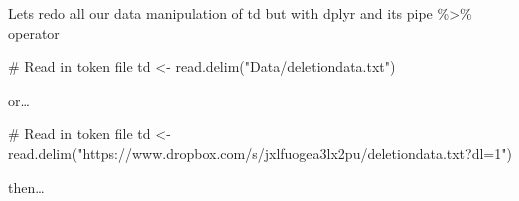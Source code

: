 \documentclass[
  12pt,
  letterpaper]{article}
\newenvironment{Shaded}{\begin{snugshade}}{\end{snugshade}}
\newcommand{\CommentTok}[1]{\textcolor[rgb]{0.37,0.37,0.37}{#1}}
\newcommand{\FunctionTok}[1]{\textcolor[rgb]{0.28,0.35,0.67}{#1}}
\newcommand{\NormalTok}[1]{\textcolor[rgb]{0.00,0.23,0.31}{#1}}
\newcommand{\OtherTok}[1]{\textcolor[rgb]{0.00,0.23,0.31}{#1}}
\newcommand{\StringTok}[1]{\textcolor[rgb]{0.13,0.47,0.30}{#1}}
\renewcommand\texttt[1]{{\ttfamily\color{BrickRed}#1}}
\begin{document}
Lets redo all our data manipulation of \texttt{td} but with
\texttt{dplyr} and its pipe \texttt{\%\textgreater{}\%} operator

\begin{Shaded}
\begin{Highlighting}[]
\CommentTok{\# Read in token file}
\NormalTok{td }\OtherTok{\textless{}{-}} \FunctionTok{read.delim}\NormalTok{(}\StringTok{"Data/deletiondata.txt"}\NormalTok{)}
\end{Highlighting}
\end{Shaded}

or\ldots{}

\begin{Shaded}
\begin{Highlighting}[]
\CommentTok{\# Read in token file}
\NormalTok{td }\OtherTok{\textless{}{-}} \FunctionTok{read.delim}\NormalTok{(}\StringTok{"https://www.dropbox.com/s/jxlfuogea3lx2pu/deletiondata.txt?dl=1"}\NormalTok{)}
\end{Highlighting}
\end{Shaded}

then\ldots{}
\end{document}
